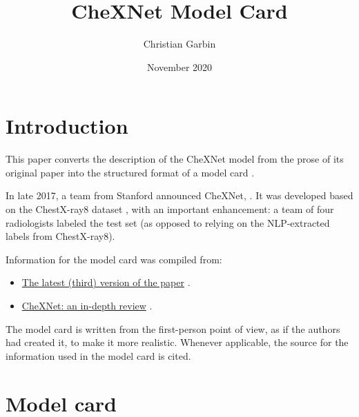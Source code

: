 \documentclass{article}
\title{CheXNet Model Card}
\author{Christian Garbin}
\date{November 2020}
\begin{document}
\maketitle

\section{Introduction}

This paper converts the description of the CheXNet model from the prose of its original paper into the structured format of a model card \cite{Mitchell2018}.

In late 2017, a team from Stanford announced CheXNet,  \cite{Rajpurkar2017}. It was developed based on the ChestX-ray8 dataset \cite{Wang2017}, with an important enhancement: a team of four radiologists labeled the test set (as opposed to relying on the NLP-extracted labels from ChestX-ray8).

Information for the model card was compiled from:

\begin{itemize}
    \item \href{https://arxiv.org/abs/1711.05225}{The latest (third) version of the paper} \cite{Rajpurkar2017}.
    \item \href{https://lukeoakdenrayner.wordpress.com/2018/01/24/chexnet-an-in-depth-review/}{CheXNet: an in-depth review} \cite{OakdenRayner2018a}.
\end{itemize}

The model card is written from the first-person point of view, as if the authors had created it, to make it more realistic. Whenever applicable, the source for the information used in the model card is cited.

\pagebreak

\section{Model card}

\newenvironment{mcsection}[1]
    {%
        \textbf{#1}

        \begin{itemize}[leftmargin=*,topsep=0pt,itemsep=-1ex,partopsep=1ex,parsep=1ex,after=\vspace{\medskipamount}]
    }
    {%
        \end{itemize}
    }
\end{document}
